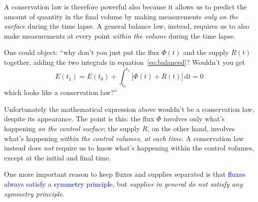 \documentclass[a4paper,12pt,%
onecolumn,oneside,%
british%
]{memoir}
\newcommand*{\di}{\mathrm{d}}%
\renewcommand*{\|}[1][]{\nonscript\:#1\vert\nonscript\:\mathopen{}}
\newcommand*{\sect}{\S}%
\renewcommand*{\autoref}[2]{\sidepar{\vspace{-1ex}\footnotesize{\color{blue}\faIcon{%
angle-right%
}\enspace\sect~\ref{#1} page~\pageref{#1}}}\textcolor{blue}{#2}}
\newcommand*{\yti}{t_{0}}
\newcommand*{\ytf}{t_{1}}
\newcommand*{\yE}{E}
\newcommand*{\yH}{\varPhi}%
\newcommand*{\yR}{R}%
\begin{document}
A conservation law is therefore powerful also because it allows us to predict the amount of quantity in the final volume by making measurements \emph{only on the surface} during the time lapse. A general balance law, instead, requires us to also make measurements at every point \emph{within the volume} during the time lapse.
\begin{warning}
  One could object: \enquote{why don't you just put the flux $\yH(t)$ and the supply $\yR(t)$ together, adding the two integrals in equation~\eqref{eq:balanced}? Wouldn't you get
  \begin{equation*}
    \yE(\ytf) = \yE(\yti) + \int_{\yti}^{\ytf}\!\!\bigl[\yH(t)+\yR(t)\bigr]\, \di t = 0
  \end{equation*}
  which looks like a conservation law?}

\medskip

Unfortunately the mathematical expression above wouldn't be a conservation law, despite its appearance. The point is this: the flux $\yH$ involves only what's happening \emph{on the control surface}; the supply $\yR$, on the other hand, involves what's happening \emph{within the control volumes, at each time}. A conservation law instead does \emph{not} require us to know what's happening within the control volumes, except at the initial and final time.

One more important reason to keep fluxes and supplies separated is that \autoref{def:symmetryflux}{fluxes always satisfy a symmetry principle}, but \emph{supplies in general do not satisfy any symmetry principle}.
\end{warning}


\end{document}
